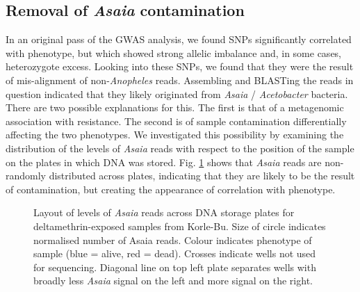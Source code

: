 \documentclass[a4paper,12pt]{article}
\begin{document}
\clearpage

\subsection{Removal of \textit{Asaia} contamination}

In an original pass of the GWAS analysis, we found SNPs significantly correlated with phenotype, but which showed strong allelic imbalance and, in some cases, heterozygote excess. Looking into these SNPs, we found that they were the result of mis-alignment of non-\textit{Anopheles} reads. Assembling and BLASTing the reads in question indicated that they likely originated from \textit{Asaia} / \textit{Acetobacter} bacteria. There are two possible explanations for this. The first is that of a metagenomic association with resistance. The second is of sample contamination differentially affecting the two phenotypes. We investigated this possibility by examining the distribution of the levels of \textit{Asaia} reads with respect to the position of the sample on the plates in which DNA was stored. Fig. \ref{FigM4} shows that \textit{Asaia} reads are non-randomly distributed across plates, indicating that they are likely to be the result of contamination, but creating the appearance of correlation with phenotype.

\begin{figure}[h]
	\hspace*{-0.5cm}
	\begin{minipage}{\textwidth}
		\begin{center}
		\end{center}
	\end{minipage}
	\caption{\footnotesize Layout of levels of \textit{Asaia} reads across DNA storage plates for deltamethrin-exposed samples from Korle-Bu. Size of circle indicates normalised number of Asaia reads. Colour indicates phenotype of sample (blue = alive, red = dead). Crosses indicate wells not used for sequencing. Diagonal line on top left plate separates wells with broadly less \textit{Asaia} signal on the left and more signal on the right. }
	\label{FigM4}
\end{figure}
\end{document}
